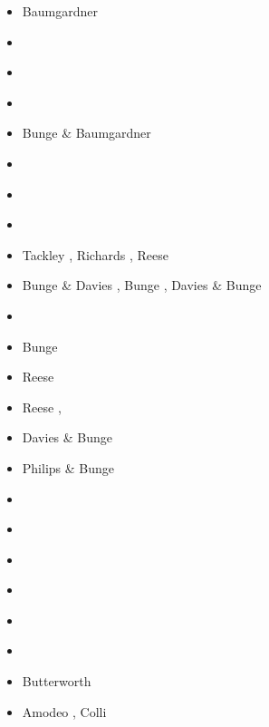 \begin{itemize}
\begin{scriptsize}
\begin{itemize}
\item[\nineteeneightythree] Baumgardner \cite{baum83}
\item[\nineteeneightyeight] \cite{glat88}
\item[\nineteenninetythree] \cite{tasg93}
\item[\nineteenninetyfour] \cite{tasg94}
\item[\nineteenninetyfive] Bunge \& Baumgardner \cite{buba95}
\item[\nineteenninetysix] \cite{buri96}
\item[\nineteenninetyseven] \cite{burb97}\cite{yang97}
\item[\nineteenninetyeight] \cite{burl98}
\item[\nineteenninetynine] Tackley \etal \cite{tabg99}, Richards \etal \cite{ribr99}, 
                           Reese \etal \cite{resb99}
\item[\twothousandone] Bunge \& Davies \cite{buda01}, Bunge \etal \cite{burm01}, 
                       Davies \& Bunge \cite{dabu01}
\item[\twothousandtwo] \cite{burb02}\cite{strb02}
\item[\twothousandthree] Bunge \etal \cite{buht03}
\item[\twothousandfour] Reese \etal \cite{resb04}
\item[\twothousandfive] Reese \etal \cite{resb05}, \cite{phbu05}
\item[\twothousandsix] Davies \& Bunge \cite{dabu06}
\item[\twothousandseven] Philips \& Bunge \cite{phbu07}
\item[\twothousandeight] \cite{heib08}\cite{shlj08}
\item[\twothousandnine] \cite{phbs09}\cite{wodd09}
                        \cite{gows09}\cite{iabu09}
                        \cite{scbs09}\cite{scbs09b}
                        \cite{scbr09}\cite{oebm09}
\item[\twothousandten] \cite{yayh10}
\item[\twothousandeleven] \cite{woda11}\cite{iahb11}
\item[\twothousandtwelve] \cite{dagd12}\cite{shbs12}
\item[\twothousandthirteen] \cite{dadb13}\cite{oflb13}
\item[\twothousandfourteen] Butterworth \etal \cite{butm14}
\item[\twothousandfifteen] Amodeo \etal \cite{amsb15}, Colli \etal \cite{cobs15}

\end{itemize}
\end{scriptsize}
\end{itemize}
